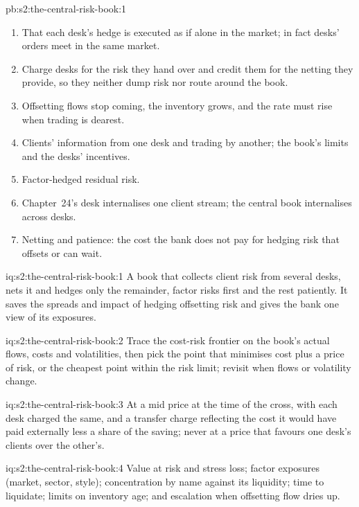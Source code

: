 \begin{solution}{pb:s2:the-central-risk-book:1}
\begin{enumerate}
deviation of \$369\,000.
\item That each desk's hedge is executed as if alone in the market; in fact desks' orders meet in the same market.
\item Charge desks for the risk they hand over and credit them for the netting they provide, so they neither dump risk nor route around the book.
\item Offsetting flows stop coming, the inventory grows, and the rate must rise when trading is dearest.
\item Clients' information from one desk and trading by another; the book's limits and the desks' incentives.
\item Factor-hedged residual risk.
\item Chapter~24's desk internalises one client stream; the central book internalises across desks.
\item Netting and patience: the cost the bank does not pay for hedging risk that offsets or can wait.
\end{enumerate}
\end{solution}

\begin{solution}{iq:s2:the-central-risk-book:1}
A book that collects client risk from several desks, nets it and hedges only the remainder, factor risks first and the rest patiently. It saves the
spreads and impact of hedging offsetting risk and gives the bank one view of its exposures.
\end{solution}

\begin{solution}{iq:s2:the-central-risk-book:2}
Trace the cost-risk frontier on the book's actual flows, costs and volatilities, then pick the point that minimises cost plus a price of risk, or the
cheapest point within the risk limit; revisit when flows or volatility change.
\end{solution}

\begin{solution}{iq:s2:the-central-risk-book:3}
At a mid price at the time of the cross, with each desk charged the same, and a transfer charge reflecting the cost it would have paid externally
less a share of the saving; never at a price that favours one desk's clients over the other's.
\end{solution}

\begin{solution}{iq:s2:the-central-risk-book:4}
Value at risk and stress loss; factor exposures (market, sector, style); concentration by name against its liquidity; time to liquidate; limits on
inventory age; and escalation when offsetting flow dries up.
\end{solution}

